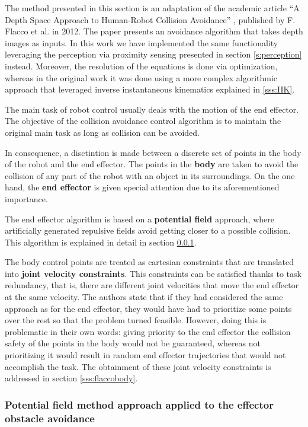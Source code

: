The method presented in this section is an adaptation of the academic article ``A Depth Space Approach to Human-Robot Collision Avoidance'' \cite{flacco2012depth}, published by F. Flacco et al. in 2012. The paper presents an avoidance algorithm that takes depth images as inputs. In this work we have implemented the same functionality leveraging the perception via proximity sensing presented in section \ref{s:perception} instead. Moreover, the resolution of the equations is done via optimization, whereas in the original work it was done using a more complex algorithmic approach that leveraged inverse instantaneous kinematics explained in \ref{sss:IIK}.

The main task of robot control usually deals with the motion of the end effector. The objective of the collision avoidance control algorithm is to maintain the original main task as long as collision can be avoided.

In consequence, a disctintion is made between a discrete set of points in the body of the robot and the end effector. The points in the \textbf{body} are taken to avoid the collision of any part of the robot with an object in its surroundings. On the one hand, the \textbf{end effector} is given special attention due to its aforementioned importance.

The end effector algorithm is based on a \textbf{potential field} approach, where artificially generated repulsive fields avoid getting closer to a possible collision. This algorithm is explained in detail in section  \ref{sss:flaccorepulsive}.

The body control points are treated as cartesian constraints that are translated into \textbf{joint velocity constraints}. This constraints can be satisfied thanks to task redundancy, that is, there are different joint velocities that move the end effector at the same velocity. The authors state that if they had considered the same approach as for the end effector, they would have had to prioritize some points over the rest so that the problem turned feasible. However, doing this is problematic in their own words: giving priority to the end effector the collision safety of the points in the body would not be guaranteed, whereas not prioritizing it would result in random end effector trajectories that would not accomplish the task. The obtainment of these joint velocity constraints is addressed in section \ref{sss:flaccobody}.

\subsubsection{Potential field method approach applied to the effector obstacle avoidance}
\label{sss:flaccorepulsive}

